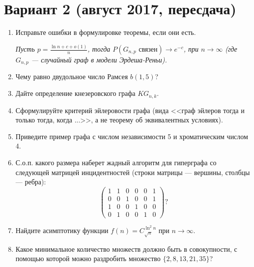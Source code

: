 \documentclass[oneside]{book}
\begin{document}
\section{Вариант 2 (август 2017, пересдача)}
\begin{enumerate}
\item Исправьте ошибки в формулировке теоремы, если они есть.

\textit{Пусть $\displaystyle p = \frac{\ln n + c + o(1)}{n}$, тогда $P(G_{n,p}\,\, \text{связен}) \rightarrow e^{-c}$, при $n \rightarrow \infty$ (где $G_{n,p}$ --- случайный граф в модели Эрдеша-Реньи).}
\item Чему равно двудольное число Рамсея $b(1, 5)$?
\item Дайте определение кнезеровского графа $KG_{n, k}$.
\item Сформулируйте критерий эйлеровости графа (вида <<граф эйлеров тогда и только тогда, когда ...>>, а не теорему об эквивалентных условиях).
\item Приведите пример графа с числом независимости 5 и хроматическим числом 4.
\item С.о.п. какого размера наберет жадный алгоритм для гиперграфа со следующей матрицей инцидентностей (строки матрицы --- вершины, столбцы --- ребра):
$$
\begin{pmatrix}
1 & 1 & 0 & 0 & 0 & 1 \\
0 & 0 & 1 & 0 & 0 & 1 \\
1 & 0 & 0 & 1 & 0 & 0 \\
0 & 1 & 0 & 0 & 1 & 0
\end{pmatrix}?
$$
\item Найдите асимптотику функции $f(n) = C_{\sqrt{n}}^{\ln^2 n}$ при $n \rightarrow \infty$.
\item Какое минимальное количество множеств должно быть в совокупности, с помощью которой можно раздробить множество $\{2, 8, 13, 21, 35\}$?
\end{enumerate}
\end{document}
